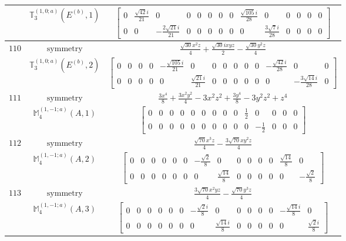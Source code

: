 \documentclass[fleqn,8pt,landscape]{jsarticle}
\begin{document}
\begin{longtable}{ccc}
$  $ & $ \mathbb{T}_{3}^{(1,0;a)}(E^{(b)},1) $ & $ \begin{bmatrix} 0 & \frac{\sqrt{42} i}{21} & 0 & 0 & 0 & 0 & 0 & 0 & \frac{\sqrt{105} i}{28} & 0 & 0 & 0 & 0 & 0 \\ 0 & 0 & - \frac{2 \sqrt{21} i}{21} & 0 & 0 & 0 & 0 & 0 & 0 & \frac{3 \sqrt{7} i}{28} & 0 & 0 & 0 & 0 \end{bmatrix} $ \\ \hline
$ 110 $ & $ \text{symmetry} $ & $ \frac{\sqrt{30} x^{2} z}{4} + \frac{\sqrt{30} i x y z}{2} - \frac{\sqrt{30} y^{2} z}{4} $ \\
$  $ & $ \mathbb{T}_{3}^{(1,0;a)}(E^{(b)},2) $ & $ \begin{bmatrix} 0 & 0 & 0 & 0 & - \frac{\sqrt{105} i}{21} & 0 & 0 & 0 & 0 & 0 & 0 & - \frac{\sqrt{42} i}{28} & 0 & 0 \\ 0 & 0 & 0 & 0 & 0 & \frac{\sqrt{21} i}{21} & 0 & 0 & 0 & 0 & 0 & 0 & - \frac{3 \sqrt{14} i}{28} & 0 \end{bmatrix} $ \\ \hline
$ 111 $ & $ \text{symmetry} $ & $ \frac{3 x^{4}}{8} + \frac{3 x^{2} y^{2}}{4} - 3 x^{2} z^{2} + \frac{3 y^{4}}{8} - 3 y^{2} z^{2} + z^{4} $ \\
$  $ & $ \mathbb{M}_{4}^{(1,-1;a)}(A,1) $ & $ \begin{bmatrix} 0 & 0 & 0 & 0 & 0 & 0 & 0 & 0 & 0 & \frac{1}{2} & 0 & 0 & 0 & 0 \\ 0 & 0 & 0 & 0 & 0 & 0 & 0 & 0 & 0 & 0 & - \frac{1}{2} & 0 & 0 & 0 \end{bmatrix} $ \\ \hline
$ 112 $ & $ \text{symmetry} $ & $ \frac{\sqrt{70} x^{3} z}{4} - \frac{3 \sqrt{70} x y^{2} z}{4} $ \\
$  $ & $ \mathbb{M}_{4}^{(1,-1;a)}(A,2) $ & $ \begin{bmatrix} 0 & 0 & 0 & 0 & 0 & 0 & - \frac{\sqrt{2}}{8} & 0 & 0 & 0 & 0 & 0 & \frac{\sqrt{14}}{8} & 0 \\ 0 & 0 & 0 & 0 & 0 & 0 & 0 & \frac{\sqrt{14}}{8} & 0 & 0 & 0 & 0 & 0 & - \frac{\sqrt{2}}{8} \end{bmatrix} $ \\ \hline
$ 113 $ & $ \text{symmetry} $ & $ \frac{3 \sqrt{70} x^{2} y z}{4} - \frac{\sqrt{70} y^{3} z}{4} $ \\
$  $ & $ \mathbb{M}_{4}^{(1,-1;a)}(A,3) $ & $ \begin{bmatrix} 0 & 0 & 0 & 0 & 0 & 0 & - \frac{\sqrt{2} i}{8} & 0 & 0 & 0 & 0 & 0 & - \frac{\sqrt{14} i}{8} & 0 \\ 0 & 0 & 0 & 0 & 0 & 0 & 0 & \frac{\sqrt{14} i}{8} & 0 & 0 & 0 & 0 & 0 & \frac{\sqrt{2} i}{8} \end{bmatrix} $ \\ \hline

\end{longtable}
\end{document}
